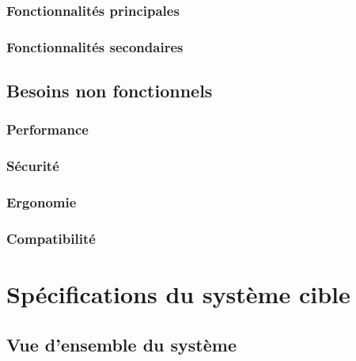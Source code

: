 \subsubsection{Fonctionnalités principales}


\subsubsection{Fonctionnalités secondaires}


\subsection{Besoins non fonctionnels}


\subsubsection{Performance}


\subsubsection{Sécurité}


\subsubsection{Ergonomie}


\subsubsection{Compatibilité}


\section{Spécifications du système cible}


\subsection{Vue d'ensemble du système}

